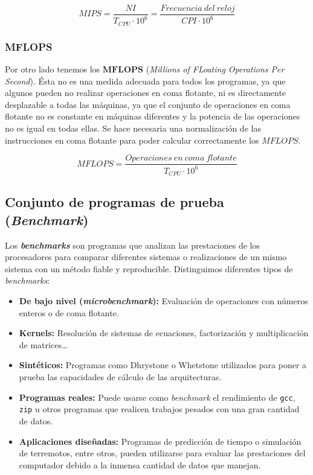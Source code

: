 \[MIPS=\frac{NI}{T_{CPU}\cdot10^6}=\frac{Frecuencia\ del\ reloj}{CPI\cdot10^6}\]

\subsubsection{MFLOPS}

Por otro lado tenemos los $\boldsymbol{MFLOPS}$ (\textit{Millions of FLoating Operations Per Second}).
Ésta no es una medida adecuada para todos los programas, ya que algunos pueden no realizar operaciones en coma flotante, ni es directamente desplazable a todas las máquinas, ya que el conjunto de operaciones en coma flotante no es constante en máquinas diferentes y la potencia de las operaciones no es igual en todas ellas.
Se hace necesaria una normalización de las instrucciones en coma flotante para poder calcular correctamente los $MFLOPS$.

\[MFLOPS=\frac{Operaciones\ en\ coma\ flotante}{T_{CPU}\cdot10^6}\]

\subsection{Conjunto de programas de prueba (\textit{Benchmark})}\label{benchmark}

Los \textbf{\textit{benchmarks}} son programas que analizan las prestaciones de los procesadores para comparar diferentes sistemas o realizaciones de un mismo sistema con un método fiable y reproducible.
Distinguimos diferentes tipos de \textit{benchmarks}:

\begin{itemize}
	\item\textbf{De bajo nivel (\textit{microbenchmark}):} Evaluación de operaciones con números enteros o de coma flotante.
	\item\textbf{Kernels:} Resolución de sistemas de ecuaciones, factorización y multiplicación de matrices\ldots
	\item\textbf{Sintéticos:} Programas como Dhrystone o Whetstone utilizados para poner a prueba las capacidades de cálculo de las arquitecturas.
	\item\textbf{Programas reales:} Puede usarse como \textit{benchmark} el rendimiento de \texttt{gcc}, \texttt{zip} u otros programas que realicen trabajos pesados con una gran cantidad de datos.
	\item\textbf{Aplicaciones diseñadas:} Programas de predicción de tiempo o simulación de terremotos, entre otros, pueden utilizarse para evaluar las prestaciones del computador debido a la inmensa cantidad de datos que manejan.
\end{itemize}

